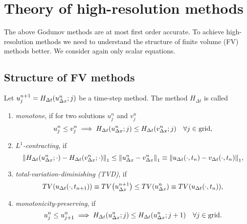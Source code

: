 \section{Theory of high-resolution methods}

The above Godunov methods are at most first order accurate.
To achieve high-resolution methods we need to understand the structure of finite volume (FV) methods better.
We consider again only scalar equations.


\subsection{Structure of FV methods}

\begin{definition}
	Let \(u_j^{n + 1} = H_{\Delta t}\parentheses*{u_{\Delta x}^n; j}\) be a time-step method.
	The method \(H_{\Delta t}\) is called
	\begin{enumerate}
		\item \emph{monotone}, if for two solutions \(u_j^n\) and \(v_j^n\)
		\[
			u_j^n \le v_j^n \implies H_{\Delta t}\parentheses*{u_{\Delta x}^n; j} \le H_{\Delta t}\parentheses*{v_{\Delta x}^n; j} \quad \forall j \in \text{grid},
		\]
		\item \emph{\(L^1\)-contracting}, if
		\[
			\norm*{H_{\Delta t}\parentheses*{u_{\Delta x}^n; \cdot} - H_{\Delta t}\parentheses*{v_{\Delta x}^n; \cdot}}_1 \le \norm*{u_{\Delta x}^n - v_{\Delta x}^n}_1 \equiv \norm*{u_{\Delta t}\parentheses*{\cdot, t_n} - v_{\Delta t}\parentheses*{\cdot, t_n}}_1,
		\]
		\item \emph{total-variation-diminishing (TVD)}, if
		\[
			TV\parentheses*{u_{\Delta t}\parentheses*{\cdot, t_{n + 1}}} \equiv TV\parentheses*{u_{\Delta x}^{n + 1}} \le TV\parentheses*{u_{\Delta x}^n} \equiv TV\parentheses*{u_{\Delta t}\parentheses*{\cdot, t_n}},
		\]
		\item \emph{monotonicity-preserving}, if
		\[
			u_j^n \le u_{j + 1}^n \implies H_{\Delta t}\parentheses*{u_{\Delta x}^n; j} \le H_{\Delta t}\parentheses*{u_{\Delta x}^n; j + 1} \quad \forall j \in \text{grid}.
		\]
	\end{enumerate}
\end{definition}

